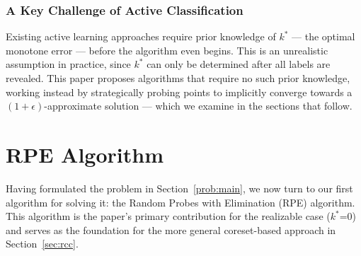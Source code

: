 \documentclass[11pt, a4paper]{article}
\theoremstyle{boxed}
\begin{document}

\subsubsection{A Key Challenge of Active Classification}
Existing active learning approaches require prior knowledge of $k^*$ --- the optimal monotone error --- before the algorithm even begins. This is an unrealistic assumption in practice, since $k^*$ can only be determined after all labels are revealed. This paper proposes algorithms that require no such prior knowledge, working instead by strategically probing points to implicitly converge towards a $(1+\epsilon)$-approximate solution --- which we examine in the sections that follow.

\newpage

\section{RPE Algorithm}
Having formulated the problem in Section~\ref{prob:main}, we now turn to our first algorithm for solving it: the Random Probes with Elimination (RPE) algorithm. This algorithm is the paper's primary contribution for the realizable case ($k^*$=0) and serves as the foundation for the more general coreset-based approach in Section~\ref{sec:rcc}.
\end{document}
